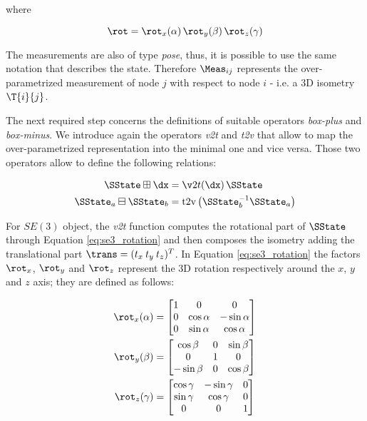 \noindent where

\begin{equation}
    \label{eq:se3_rotation}
    \rot = \rot_x(\alpha) \, \rot_y(\beta)\, \rot_z(\gamma)
\end{equation}

The measurements are also of type \textit{pose}, thus, it is possible to use the same notation that describes the state. Therefore $\Meas_{ij}$ represents the over-parametrized measurement of node $j$ with respect to node $i$ - i.e. a 3D isometry $\T{i}{j}$.

The next required step concerns the definitions of suitable operators \textit{box-plus} and \textit{box-minus}. We introduce again the operators \textit{v2t} and \textit{t2v} that allow to map the over-parametrized representation into the minimal one and vice versa. Those two operators allow to define the following relations:

\begin{align}
    \label{eq:standard_boxplus_se3}
    \SState \boxplus \dx &= \v2t(\dx) \, \SState \\
    \label{eq:standard_boxminus_se3}
    \SState_a \boxminus \SState_b &= \text{t2v}\left(\SState_b^{-1}\SState_a\right)
\end{align}

\noindent For $SE(3)$ object, the \textit{v2t} function computes the rotational part of $\SState$ through Equation \ref{eq:se3_rotation} and then composes the isometry adding the translational part $\trans = (t_x \: t_y \: t_z)^T$. In Equation \ref{eq:se3_rotation} the factors $\rot_x$, $\rot_y$ and $\rot_z$ represent the 3D rotation respectively around the $x$, $y$ and $z$ axis; they are defined as follows:

\begin{align}
    \label{eq:rotx_3d}
    \rot_x(\alpha) &= 
        \begin{bmatrix}
            1 & 0 & 0 \\ 0 & \cos\alpha & -\sin\alpha \\ 0 & \sin\alpha & \cos\alpha
        \end{bmatrix} \\
    \label{eq:roty_3d}
    \rot_y(\beta) &=
        \begin{bmatrix}
            \cos\beta & 0 & \sin\beta \\ 0 & 1 & 0\\ -\sin\beta & 0 & \cos\beta
        \end{bmatrix} \\
    \label{eq:rotz_3d}
    \rot_z(\gamma) &= 
        \begin{bmatrix}
            \cos\gamma & -\sin\gamma & 0 \\ \sin\gamma & \cos\gamma & 0 \\ 0&0&1
        \end{bmatrix} 
\end{align}

